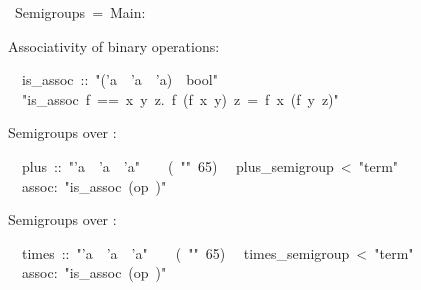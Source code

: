 \begin{isabelle}%
~Semigroups~=~Main:%
\begin{isamarkuptext}%
\noindent Associativity of binary operations:%
\end{isamarkuptext}%
\isanewline
~~is\_assoc~::~{"}('a~{\isasymRightarrow}~'a~{\isasymRightarrow}~'a)~{\isasymRightarrow}~bool{"}\isanewline
~~{"}is\_assoc~f~==~{\isasymforall}x~y~z.~f~(f~x~y)~z~=~f~x~(f~y~z){"}%
\begin{isamarkuptext}%
\medskip\noindent Semigroups over :
\end{isamarkuptext}%
\isanewline
~~plus~::~{"}'a~{\isasymRightarrow}~'a~{\isasymRightarrow}~'a{"}~~~~(~{"}{\isasymOplus}{"}~65)\isanewline
{}\isanewline
~~plus\_semigroup~<~{"}term{"}\isanewline
~~assoc:~{"}is\_assoc~(op~{\isasymOplus}){"}%
\begin{isamarkuptext}%
\medskip\noindent Semigroups over :
\end{isamarkuptext}%
\isanewline
~~times~::~{"}'a~{\isasymRightarrow}~'a~{\isasymRightarrow}~'a{"}~~~~(~{"}{\isasymOtimes}{"}~65)\isanewline
{}\isanewline
~~times\_semigroup~<~{"}term{"}\isanewline
~~assoc:~{"}is\_assoc~(op~{\isasymOtimes}){"}\isanewline
\isanewline
{}\end{isabelle}%
